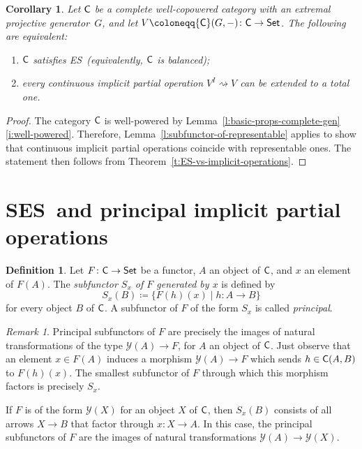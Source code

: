 \documentclass[a4paper,10pt,reqno]{amsart}
\newtheorem{corollary}[theorem]{Corollary}
\theoremstyle{definition}
\newtheorem{definition}[theorem]{Definition}
\theoremstyle{remark}
\newtheorem{remark}[theorem]{Remark}
\newcommand{\cat}{{\sf C}}								%
\newcommand{\Set}{{\sf Set}}							%
\newcommand{\yo}{\mathcal{Y}}
\newcommand{\ES}{\textnormal{ES}}
\newcommand{\SES}{\textnormal{SES}}
\begin{document}
\begin{corollary}\label{cor:ES-vs-continuous-operations}
Let $\cat$ be a complete well-copowered category with an extremal projective generator~$G$, and let $V\coloneqq \cat(G,-)\colon\cat\to\Set$. The following are equivalent:
%
\begin{enumerate}[label=(\arabic*),series=implicitops]
\item\label{i:well-copowered-Cat-satisfies-ES} $\cat$ satisfies \ES~(equivalently, $\cat$ is balanced);
\item\label{i:continuous-admits-extension} every continuous implicit partial operation $V^{I} \rightsquigarrow V$ can be extended to a total one.
\end{enumerate}
\end{corollary}

\begin{proof}
The category $\cat$ is well-powered by Lemma~\ref{l:basic-props-complete-gen}\ref{i:well-powered}. Therefore, Lemma~\ref{l:subfunctor-of-representable} applies to show that continuous implicit partial operations coincide with representable ones. The statement then follows from Theorem~\ref{t:ES-vs-implicit-operations}.
\end{proof}

\section{\SES~and principal implicit partial operations}\label{s:implicit-SES}

\begin{definition}\label{def:principal-subfunctor}
Let $F\colon \cat \to\Set$ be a functor, $A$ an object of $\cat$, and $x$ an element of $F(A)$. The \emph{subfunctor $S_{x}$ of $F$ generated by $x$} is defined by
\[
S_{x}(B)\coloneqq \{F(h)(x)\mid h\colon A \to B\}
\]
for every object $B$ of $\cat$. 
%
A subfunctor of $F$ of the form $S_x$ is called \emph{principal}.
\end{definition}

\begin{remark}
Principal subfunctors of $F$ are precisely the images of natural transformations of the type $\yo(A)\to F$, for $A$ an object of $\cat$. Just observe that an element $x\in F(A)$ induces a morphism $\yo(A)\to F$ which sends $h\in \cat(A,B)$ to $F(h)(x)$. The smallest subfunctor of $F$ through which this morphism factors is precisely $S_{x}$.

If $F$ is of the form $\yo(X)$ for an object $X$ of $\cat$, then $S_{x}(B)$ consists of all arrows $X\to B$ that factor through $x\colon X\to A$. In this case, the principal subfunctors of $F$ are the images of natural transformations $\yo(A) \to\yo(X)$. 
\end{remark}
\end{document}
